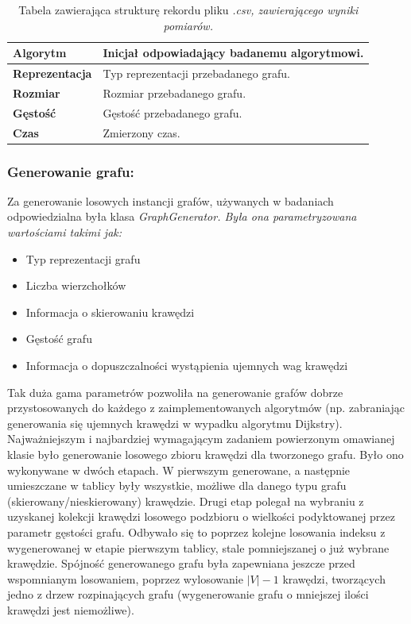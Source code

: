 \documentclass[a4paper,12pt]{article}
\begin{document}
\begin{table}[H]
	\centering
	\label{tab.wynik-pomairu}
	\caption{\centering Tabela zawierająca strukturę rekordu pliku \it *.csv\rm, zawierającego wyniki pomiarów.}
	\begin{tabular}{|l|l|}
		\hline
		\textbf{Algorytm}      & Inicjał odpowiadający badanemu algorytmowi. \\ \hline
		\textbf{Reprezentacja} & Typ reprezentacji przebadanego grafu.       \\ \hline
		\textbf{Rozmiar}       & Rozmiar przebadanego grafu.                 \\ \hline
		\textbf{Gęstość}       & Gęstość przebadanego grafu.                 \\ \hline
		\textbf{Czas}          & Zmierzony czas.                             \\ \hline
	\end{tabular}
\end{table}

\subsubsection{Generowanie grafu:}
Za generowanie losowych instancji grafów, używanych w badaniach odpowiedzialna była klasa \it GraphGenerator\rm. Była ona parametryzowana wartościami takimi jak:
\begin{itemize}
	\item Typ reprezentacji grafu
	\item Liczba wierzchołków
	\item Informacja o skierowaniu krawędzi
	\item Gęstość grafu
	\item Informacja o dopuszczalności wystąpienia ujemnych wag krawędzi
\end{itemize}
\vspace{5mm}

\noindent
Tak duża gama parametrów pozwoliła na generowanie grafów dobrze przystosowanych do każdego z zaimplementowanych algorytmów (np. zabraniając generowania się ujemnych krawędzi w wypadku algorytmu Dijkstry).\\

\noindent
Najważniejszym i najbardziej wymagającym zadaniem powierzonym omawianej klasie było generowanie losowego zbioru krawędzi dla tworzonego grafu. Było ono wykonywane w dwóch etapach. W pierwszym generowane, a następnie umieszczane w tablicy były wszystkie, możliwe dla danego typu grafu (skierowany/nieskierowany) krawędzie. Drugi etap polegał na wybraniu z uzyskanej kolekcji krawędzi losowego podzbioru o wielkości podyktowanej przez parametr gęstości grafu. Odbywało się to poprzez kolejne losowania indeksu z wygenerowanej w etapie pierwszym tablicy, stale pomniejszanej o już wybrane krawędzie. Spójność generowanego grafu była zapewniana jeszcze przed wspomnianym losowaniem, poprzez wylosowanie $|V|-1$ krawędzi, tworzących jedno z drzew rozpinających grafu (wygenerowanie grafu o mniejszej ilości krawędzi jest niemożliwe).
\end{document}
